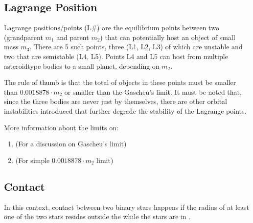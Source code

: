 \documentclass[letterpaper,10pt,english]{sphinxmanual}
\begin{document}
\subsection{Lagrange Position}
\label{\detokenize{quantities/orbital/lagrange_position:lagrange-position}}\label{\detokenize{quantities/orbital/lagrange_position::doc}}\label{\detokenize{quantities/orbital/lagrange_position:id1}}
\sphinxAtStartPar
Lagrange positions/points (L\#) are the equilibrium points between
two {\hyperref[\detokenize{quantities/material/mass:id1}]{}} (grandparent \(m_1\) and parent \(m_2\)) that can
potentially host an object of small mass \(m_3\). There are
5 such points, three (L1, L2, L3) of which are unstable and two that are semi\sphinxhyphen{}stable (L4, L5).
Points L4 and L5 can host from multiple asteroid\sphinxhyphen{}type bodies to a small planet, depending on \(m_2\).

\sphinxAtStartPar
The rule of thumb is that the total {\hyperref[\detokenize{quantities/material/mass:id1}]{}} of objects in these points
must be smaller than \(0.0018878 \cdot m_2\) or smaller than the Gascheu’s limit.
It must be noted that, since the three bodies are never just by themselves,
there are other orbital instabilities introduced that
further degrade the stability of the Lagrange points.

\sphinxAtStartPar
More information about the limits on:
\begin{enumerate}
%
\item {} 
\sphinxAtStartPar
{} (For a discussion on Gascheu’s limit)

\item {} 
\sphinxAtStartPar
{} (For simple \(0.0018878 \cdot m_2\) limit)

\end{enumerate}


\subsection{Contact}
\label{\detokenize{quantities/orbital/contact:contact}}\label{\detokenize{quantities/orbital/contact::doc}}\label{\detokenize{quantities/orbital/contact:id1}}
\sphinxAtStartPar
In this context, contact between two binary stars happens if the radius of at least
one of the two stars resides outside the {\hyperref[\detokenize{quantities/orbital/roche_lobe:id1}]{}} while the stars
are in {\hyperref[\detokenize{quantities/orbital/periapsis:id1}]{}}.
\end{document}
